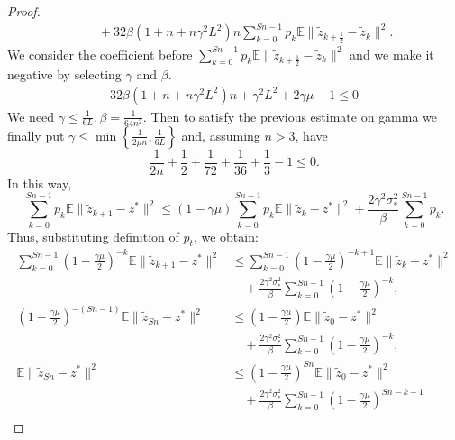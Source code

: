\documentclass{article}
\begin{document}
\begin{proof}
\begin{align*}
            & \quad + 32\beta\left(1 + n + n\gamma^2 L^2\right)n\sum\limits_{k = 0}^{Sn-1} p_k \mathbb{E} \|\widetilde{z}_{k + \frac{1}{2}} - \widetilde{z}_k\|^2.
        \end{align*}
        We consider the coefficient before $\sum\limits_{k = 0}^{Sn-1} p_k\mathbb E\|\widetilde{z}_{k+\frac{1}{2}} - \widetilde{z}_k\|^2$ and we make it negative  by selecting $\gamma$ and $\beta$.
        \begin{gather*}
            32\beta(1 + n + n\gamma^2 L^2)n + \gamma^2 L^2 + 2\gamma\mu - 1 \leqslant 0
        \end{gather*}
        We need $\gamma\leqslant\frac{1}{6L}, \beta = \frac{1}{64n^2}.$ Then to satisfy the previous estimate on gamma we finally put $\gamma \leqslant \min\left\{\frac{1}{2\mu n}, \frac{1}{6L}\right\}$ and, assuming $n > 3$, have $$\frac{1}{2n} + \frac{1}{2} + \frac{1}{72} + \frac{1}{36} + \frac{1}{3} - 1 \leqslant 0.$$
        In this way,
        \begin{equation*}
            \sum\limits_{k = 0}^{Sn-1} p_k\mathbb{E} \|\widetilde{z}_{k+1} - z^*\|^2\leqslant (1 - \gamma\mu)\sum\limits_{k = 0}^{Sn-1} p_k\mathbb{E} \|\widetilde{z}_k - z^*\|^2 +  \frac{2\gamma^2\sigma_*^2}{\beta}\sum\limits_{k = 0}^{Sn-1}p_k.
        \end{equation*}
        Thus, substituting definition of $p_t$, we obtain:
        \begin{align*}
            \sum\limits_{k = 0}^{Sn-1} \left(1-\frac{\gamma\mu}{2}\right)^{-k}\mathbb{E} \|\widetilde{z}_{k+1} - z^*\|^2 & \leqslant \sum\limits_{k = 0}^{Sn-1} \left(1-\frac{\gamma\mu}{2}\right)^{-k + 1}\mathbb{E} \|\widetilde{z}_k - z^*\|^2 \\
            & \quad + \frac{2\gamma^2\sigma_*^2}{\beta}\sum\limits_{k = 0}^{Sn-1}\left(1-\frac{\gamma\mu}{2}\right)^{-k},\\
            \left(1-\frac{\gamma\mu}{2}\right)^{-(Sn-1)}\mathbb{E} \|\widetilde{z}_{Sn} - z^*\|^2 & \leqslant \left(1-\frac{\gamma\mu}{2}\right)\mathbb{E} \|\widetilde{z}_0 - z^*\|^2 \\
            & \quad + \frac{2\gamma^2\sigma_*^2}{\beta}\sum\limits_{k = 0}^{Sn-1}\left(1-\frac{\gamma\mu}{2}\right)^{-k},\\
            \mathbb{E} \|\widetilde{z}_{Sn} - z^*\|^2 & \leqslant \left(1-\frac{\gamma\mu}{2}\right)^{Sn}\mathbb{E} \|\widetilde{z}_0 - z^*\|^2\\
            & \quad + \frac{2\gamma^2\sigma_*^2}{\beta}\sum\limits_{k = 0}^{Sn-1}\left(1-\frac{\gamma\mu}{2}\right)^{Sn-k-1}\\

\end{align*}
\end{proof}
\end{document}
